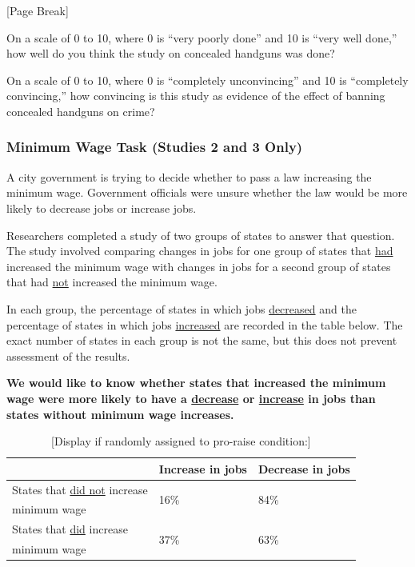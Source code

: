 \begin{center}
{[}Page Break{]}\\
\end{center}

On a scale of 0 to 10, where 0 is ``very poorly done'' and 10 is ``very well done,'' how well do you think the study on concealed handguns was done?

\bigskip
On a scale of 0 to 10, where 0 is ``completely unconvincing'' and 10 is ``completely convincing,'' how convincing is this study as evidence of the effect of banning concealed handguns on crime?

\subsubsection{Minimum Wage Task (Studies 2 and 3 Only)}
A city government is trying to decide whether to pass a law increasing the minimum wage. Government officials were unsure whether the law would be more likely to decrease jobs or increase jobs.
 
\medskip
Researchers completed a study of two groups of states to answer that question. The study involved comparing changes in jobs for one group of states that \uline{had} increased the minimum wage with changes in jobs for a second group of states that had \uline{not} increased the minimum wage.
 
\medskip
In each group, the percentage of states in which jobs \uline{decreased} and the percentage of states in which jobs \uline{increased} are recorded in the table below. The exact number of states in each group is not the same, but this does not prevent assessment of the results.
 
\medskip
\textbf{We would like to know whether states that increased the minimum wage were more likely to have a \underline{decrease} or \underline{increase} in jobs than states without minimum wage increases.}

\begin{table}[h]
\centering
\caption*{{[}Display if randomly assigned to pro-raise condition:{]}} \label{tab:siprowage}
\begin{tabular}{|l|l|l|}
\hline 
  & Increase in jobs  & Decrease in jobs \\\hline
  States that \underline{did not} increase     & \multirow{2}{*}{16\%} & \multirow{2}{*}{84\%} \\ 
  minimum wage           &               & \\ \hline
  States that \underline{did} increase & \multirow{2}{*}{37\%} & \multirow{2}{*}{63\%} \\ 
  minimum wage           &               &  \\\hline
\end{tabular}
\end{table}

